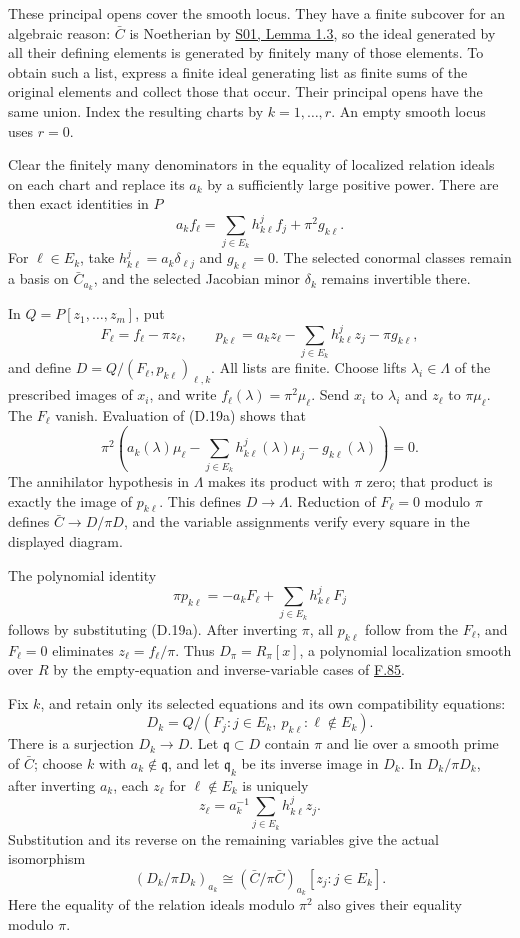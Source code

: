 \documentclass[11pt,a4paper,openany]{report}
\begin{document}
These principal opens cover the smooth locus. They have a finite subcover for an algebraic reason: \(\bar C\) is Noetherian by \href{https://github.com/KokunoYumeto/open-math-courses/blob/main/docs/courses/AG-RG/AG-RG-S01.md}{S01, Lemma 1.3}, so the ideal generated by all their defining elements is generated by finitely many of those elements. To obtain such a list, express a finite ideal generating list as finite sums of the original elements and collect those that occur. Their principal opens have the same union. Index the resulting charts by \(k=1,\ldots,r\). An empty smooth locus uses \(r=0\).

Clear the finitely many denominators in the equality of localized relation ideals on each chart and replace its \(a_k\) by a sufficiently large positive power. There are then exact identities in \(P\) \[
a_kf_\ell=\sum_{j\in E_k}h_{k\ell}^jf_j+\pi^2g_{k\ell}.
\tag{D.19a}
\] For \(\ell\in E_k\), take \(h_{k\ell}^j=a_k\delta_{\ell j}\) and \(g_{k\ell}=0\). The selected conormal classes remain a basis on \(\bar C_{a_k}\), and the selected Jacobian minor \(\delta_k\) remains invertible there.

In \(Q=P[z_1,\ldots,z_m]\), put \[
F_\ell=f_\ell-\pi z_\ell,\qquad
p_{k\ell}=a_kz_\ell-\sum_{j\in E_k}h_{k\ell}^jz_j-\pi g_{k\ell},
\] and define \(D=Q/(F_\ell,p_{k\ell})_{\ell,k}\). All lists are finite. Choose lifts \(\lambda_i\in\Lambda\) of the prescribed images of \(x_i\), and write \(f_\ell(\lambda)=\pi^2\mu_\ell\). Send \(x_i\) to \(\lambda_i\) and \(z_\ell\) to \(\pi\mu_\ell\). The \(F_\ell\) vanish. Evaluation of (D.19a) shows that \[
\pi^2\left(a_k(\lambda)\mu_\ell-
\sum_{j\in E_k}h_{k\ell}^j(\lambda)\mu_j-g_{k\ell}(\lambda)\right)=0.
\] The annihilator hypothesis in \(\Lambda\) makes its product with \(\pi\) zero; that product is exactly the image of \(p_{k\ell}\). This defines \(D\to\Lambda\). Reduction of \(F_\ell=0\) modulo \(\pi\) defines \(\bar C\to D/\pi D\), and the variable assignments verify every square in the displayed diagram.

The polynomial identity \[
\pi p_{k\ell}=-a_kF_\ell+\sum_{j\in E_k}h_{k\ell}^jF_j
\tag{D.19b}
\] follows by substituting (D.19a). After inverting \(\pi\), all \(p_{k\ell}\) follow from the \(F_\ell\), and \(F_\ell=0\) eliminates \(z_\ell=f_\ell/\pi\). Thus \(D_\pi=R_\pi[x]\), a polynomial localization smooth over \(R\) by the empty-equation and inverse-variable cases of \hyperref[AG-RG-S05-algebra-lemma-standard-smooth]{F.85}.

Fix \(k\), and retain only its selected equations and its own compatibility equations: \[
D_k=Q/(F_j:j\in E_k,\ p_{k\ell}:\ell\notin E_k).
\] There is a surjection \(D_k\to D\). Let \(\mathfrak q\subset D\) contain \(\pi\) and lie over a smooth prime of \(\bar C\); choose \(k\) with \(a_k\notin\mathfrak q\), and let \(\mathfrak q_k\) be its inverse image in \(D_k\). In \(D_k/\pi D_k\), after inverting \(a_k\), each \(z_\ell\) for \(\ell\notin E_k\) is uniquely \[
z_\ell=a_k^{-1}\sum_{j\in E_k}h_{k\ell}^jz_j.
\] Substitution and its reverse on the remaining variables give the actual isomorphism \[
(D_k/\pi D_k)_{a_k}
 \cong(\bar C/\pi\bar C)_{a_k}[z_j:j\in E_k].
\tag{D.19c}
\] Here the equality of the relation ideals modulo \(\pi^2\) also gives their equality modulo \(\pi\).
\end{document}
